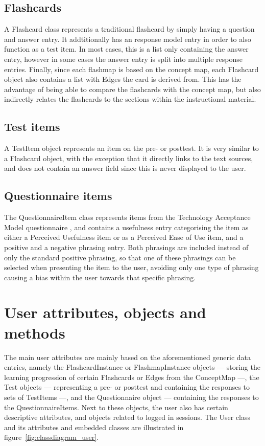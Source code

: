\subsection{Flashcards}

A Flashcard class represents a traditional flashcard by simply having a question and answer entry. It addtitionally has an response model entry in order to also function as a test item. In most cases, this is a list only containing the answer entry, however in some cases the answer entry is split into multiple response entries. Finally, since each flashmap is based on the concept map, each Flashcard object also contains a list with Edges the card is derived from. This has the advantage of being able to compare the flashcards with the concept map, but also indirectly relates the flashcards to the sections within the instructional material.

\subsection{Test items}

A TestItem object represents an item on the pre- or posttest. It is very similar to a Flashcard object, with the exception that it directly links to the text sources, and does not contain an answer field since this is never displayed to the user.

\subsection{Questionnaire items}

The QuestionnaireItem class represents items from the Technology Acceptance Model questionnaire \cite{tamq}, and contains a usefulness entry categorising the item as either a Perceived Usefulness item or as a Perceived Ease of Use item, and a positive and a negative phrasing entry. Both phrasings are included instead of only the standard positive phrasing, so that one of these phrasings can be selected when presenting the item to the user, avoiding only one type of phrasing causing a bias within the user towards that specific phrasing.

\section{User attributes, objects and methods}

The main user attributes are mainly based on the aforementioned generic data entries, namely the FlashcardInstance or FlashmapInstance objects --- storing the learning progression of certain Flashcards or Edges from the ConceptMap ---, the Test objects --- representing a pre- or posttest and containing the responses to sets of TestItems ---, and the Questionnaire object --- containing the responses to the QuestionnaireItems. Next to these objects, the user also has certain descriptive attributes, and objects related to logged in sessions. The User class and its attributes and embedded classes are illustrated in figure~\ref{fig:classdiagram_user}.

